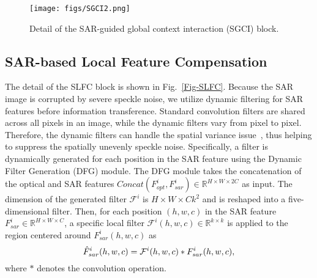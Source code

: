 \documentclass[a4paper,fleqn]{cas-dc}
\begin{document}
\begin{figure}[!t]
	\centering
	\texttt{[image: figs/SGCI2.png]}
	\caption{Detail of the SAR-guided global context interaction (SGCI) block. }
	\label{Fig-SGCI}
	\vspace{-5mm}
\end{figure}

\subsection{SAR-based Local Feature Compensation}
\label{Sec-SLFC}
The detail of the SLFC block is shown in Fig.~\ref{Fig-SLFC}.
Because the SAR image is corrupted by severe speckle noise, we utilize dynamic filtering for SAR features before information transference.  Standard convolution filters are shared across all pixels in an image, while the dynamic filters vary
from pixel to pixel. Therefore, the dynamic filters can handle the spatial variance issue~\citep{jia2016dynamic, zhou2019spatio}, thus helping to suppress the spatially unevenly speckle noise. Specifically, 
a filter is dynamically generated for each position in the SAR feature using the Dynamic Filter Generation (DFG) module.
The DFG module takes the concatenation of the optical and SAR features $Concat(F^i_{opt}, F^i_{sar})\in\mathbb{R}^{H\times W\times 2C}$ as input. The dimension of the generated filter $\mathcal{F}^i$ is $H\times W \times Ck^2$ and is reshaped into a five-dimensional filter. Then, for each position
$(h, w, c)$ in the SAR feature $F^i_{sar}\in\mathbb{R}^{H\times W\times C}$, a specific local filter
$\mathcal{F}^i(h, w, c)\in\mathbb{R}^{k\times k}$ is applied to the region centered around $F^i_{sar}(h, w, c)$ as
\begin{equation}
	\setlength{\abovedisplayskip}{4pt}	
	\setlength{\belowdisplayskip}{4pt}
	\hat{F}^i_{sar}(h, w, c)= \mathcal{F}^i(h, w, c)\ast F^i_{sar}(h, w, c),
	\label{dynamic filter}
\end{equation}
where $\ast$ denotes the convolution operation. 
\end{document}
